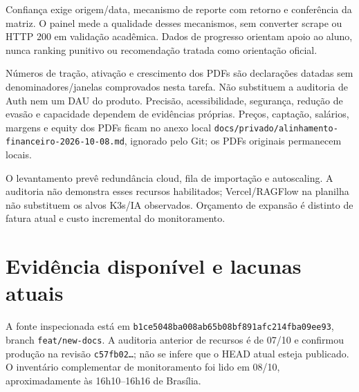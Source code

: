 \documentclass[10pt,a4paper]{article}
\begin{document}
Confiança exige origem/data, mecanismo de reporte com retorno e
conferência da matriz. O painel mede a qualidade desses mecanismos, sem
converter scrape ou HTTP 200 em validação acadêmica. Dados de progresso
orientam apoio ao aluno, nunca ranking punitivo ou recomendação tratada
como orientação oficial.

Números de tração, ativação e crescimento dos PDFs são declarações
datadas sem denominadores/janelas comprovados nesta tarefa. Não
substituem a auditoria de Auth nem um DAU do produto. Precisão,
acessibilidade, segurança, redução de evasão e capacidade dependem de
evidências próprias. Preços, captação, salários, margens e equity dos
PDFs ficam no anexo local
{\footnotesize\ttfamily\nolinkurl{docs/privado/alinhamento-financeiro-2026-10-08.md}}, ignorado
pelo Git; os PDFs originais permanecem locais.

O levantamento prevê redundância cloud, fila de importação e
autoscaling. A auditoria não demonstra esses recursos habilitados;
Vercel/RAGFlow na planilha não substituem os alvos K3s/IA observados.
Orçamento de expansão é distinto de fatura atual e custo incremental do
monitoramento.

\clearpage
\section{Evidência disponível e lacunas
atuais}\label{eviduxeancia-disponuxedvel-e-lacunas-atuais}

A fonte inspecionada está em
{\footnotesize\ttfamily\nolinkurl{b1ce5048ba008ab65b08bf891afc214fba09ee93}}, branch
{\footnotesize\ttfamily\nolinkurl{feat/new-docs}}. A auditoria anterior de recursos é de 07/10 e
confirmou produção na revisão {\footnotesize\ttfamily\nolinkurl{c57fb02…}}; não se infere que o
HEAD atual esteja publicado. O inventário complementar de monitoramento
foi lido em 08/10, aproximadamente às 16h10--16h16 de Brasília.
\end{document}
